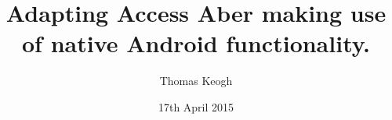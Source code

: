 
\title{Adapting Access Aber making use of native
Android functionality.}

\author{Thomas Keogh}




\date{17th April 2015} %




\maketitle




